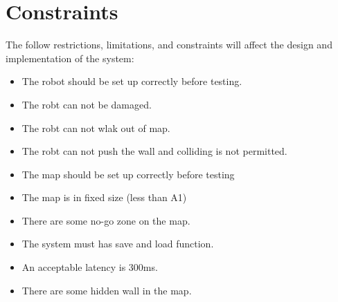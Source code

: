 \documentclass[11pt, a4paper]{report}
\begin{document}
\section{Constraints}
The follow restrictions, limitations, and constraints will affect the design and implementation of the system:
\begin{itemize}
  \item The robot should be set up correctly before testing.
  \item The robt can not be damaged.
  \item The robt can not wlak out of map.
  \item The robt can not push the wall and colliding is not permitted.
  \item The map should be set up correctly before testing
  \item The map is in fixed size (less than A1)
  \item There are some no-go zone on the map.
  \item The system must has save and load function.
  \item An acceptable latency is 300ms.
  \item There are some hidden wall in the map.
\end{itemize}


\pagebreak
\end{document}
